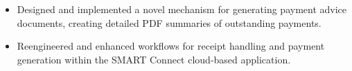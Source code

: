 \begin{minipage}{\linewidth}
\begin{itemize}
  \item Designed and implemented a novel mechanism for generating payment advice documents, creating detailed PDF summaries of outstanding payments.
  \item Reengineered and enhanced workflows for receipt handling and payment generation within the SMART Connect cloud-based application.
\end{itemize}
\end{minipage}
\divider
